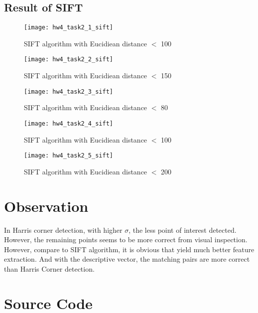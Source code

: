 \documentclass[11pt]{article}
\begin{document}
\subsection*{Result of SIFT}

\begin{figure}[H]
\centering
\texttt{[image: hw4\_task2\_1\_sift]}
\caption{SIFT algorithm with Eucidiean distance $<$ 100}
\label{}
\end{figure}

\begin{figure}[H]
\centering
\texttt{[image: hw4\_task2\_2\_sift]}
\caption{SIFT algorithm with Eucidiean distance $<$ 150}
\label{}
\end{figure}

\begin{figure}[H]
\centering
\texttt{[image: hw4\_task2\_3\_sift]}
\caption{SIFT algorithm with Eucidiean distance $<$ 80}
\label{}
\end{figure}

\begin{figure}[H]
\centering
\texttt{[image: hw4\_task2\_4\_sift]}
\caption{SIFT algorithm with Eucidiean distance $<$ 100}
\label{}
\end{figure}

\begin{figure}[H]
\centering
\texttt{[image: hw4\_task2\_5\_sift]}
\caption{SIFT algorithm with Eucidiean distance $<$ 200}
\label{}
\end{figure}


\section*{Observation}

In Harris corner detection, with higher $\sigma$, the less point of interest detected. However, the remaining points seems to be more correct from visual inspection. However, compare to SIFT algorithm, it is obvious that yield much better feature extraction. And with the descriptive vector, the matching pairs are more correct than Harris Corner detection.


\section*{Source Code}
\end{document}
